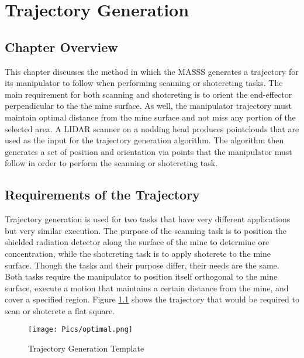 \chapter{Trajectory Generation}
\label{chap:traj}
\section{Chapter Overview}
This chapter discusses the method in which the MASSS generates a trajectory for its manipulator to follow when performing scanning or shotcreting tasks. The main requirement for both scanning and shotcreting is to orient the end-effector perpendicular to the the mine surface. As well, the manipulator trajectory must maintain optimal distance from the mine surface and not miss any portion of the selected area. A LIDAR scanner on a nodding head produces pointclouds that are used as the input for the trajectory generation algorithm. The algorithm then generates a set of position and orientation via points that the manipulator must follow in order to perform the scanning or shotcreting task.\\

\section{Requirements of the Trajectory}

Trajectory generation is used for two tasks that have very different applications but very similar execution. The purpose of the scanning task is to position the shielded radiation detector along the surface of the mine to determine ore concentration, while the shotcreting task is to apply shotcrete to the mine surface. Though the tasks and their purpose differ, their needs are the same. Both tasks require the manipulator to position itself orthogonal to the mine surface, execute a motion that maintains a certain distance from the mine, and cover a specified region. Figure \ref{fig:idealspray} shows the trajectory that would be required to scan or shotcrete a flat square.\\

\begin{figure}[h]
    \centering
    \texttt{[image: Pics/optimal.png]}
    \caption{Trajectory Generation Template}
    \label{fig:idealspray}
\end{figure}

